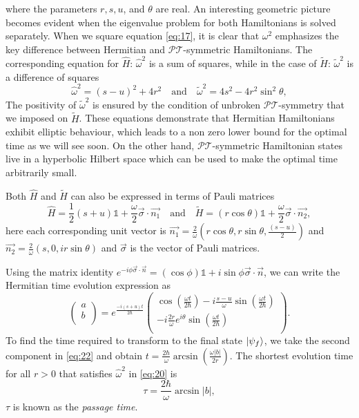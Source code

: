 \documentclass[12pt, a4paper]{report}
\newcommand\PT{\(\mathcal{PT}\)}
\begin{document}
where the parameters $r, s, u$, and $\theta$ are real.
An interesting geometric picture becomes evident when the eigenvalue problem for both Hamiltonians is solved separately. When we square equation \ref{eq:17}, it is clear that $\omega^2$ emphasizes the key
difference between Hermitian and \PT -symmetric
Hamiltonians\cite{Bender_2007}. The corresponding equation for $\hat{H}$: $\hat{\omega}^2$ is a sum of squares, while in the case of $\tilde{H}$: $\tilde{\omega}^2$ is a difference of squares
\begin{equation}\label{eq:20}
\hat{\omega}^{2} = (s - u)^2 + 4r^2 \quad\mathrm{and}\quad \tilde{\omega}^2 = 4s^2 - 4r^2 \sin^2\theta,
\end{equation}
The positivity of $\tilde{\omega}^2$ is ensured by the condition of unbroken \PT-symmetry\cite{Bender_2007} that we imposed on $\tilde{H}$.
These equations demonstrate that Hermitian Hamiltonians exhibit elliptic behaviour, which leads to a non zero lower bound for the optimal time\cite{Bender_2007} as we will see soon. On the other hand, \PT-symmetric Hamiltonian states live in a hyperbolic Hilbert space which can be used to make the optimal time arbitrarily small.

Both $\hat{H}$ and $\tilde{H}$ can also be expressed in terms of Pauli matrices
\begin{equation}\label{eq:21}
\hat{H} = \frac{1}{2}(s+u)\mathds{1} + \frac{\omega}{2}\vec{\sigma} \cdot\vec{n_1}\quad\mathrm{and}\quad \tilde{H} = (r\cos\theta)\mathds{1} + \frac{\omega}{2}\vec{\sigma} \cdot\vec{n_2},
\end{equation} 
here each corresponding unit vector is $\vec{n_1} = \frac{2}{\omega}(r\cos\theta, r\sin\theta, \frac{(s-u)}{2})$ and $\vec{n_2} = \frac{2}{\omega}(s, 0 , ir\sin\theta)$ and $\vec{\sigma}$ is the vector of Pauli matrices.

Using the matrix identity $e^{-i\phi\vec{\sigma} \cdot\vec{n}} = (\cos\phi)\mathds{1} + i\sin\phi\vec{\sigma} \cdot\vec{n}$, we can write the Hermitian time evolution expression as
\begin{equation}\label{eq:22}
\begin{pmatrix}
a \\
b \\                
\end{pmatrix} = e^{\frac{-i(s+u)t}{2\hbar}}
\begin{pmatrix}
\cos(\frac{\omega t}{2\hbar}) - i \frac{s - u}{\omega} \sin(\frac{\omega t}{2\hbar})\\
- i \frac{2r}{\omega} e^{i \theta} \sin(\frac{\omega t}{2\hbar}) \\
\end{pmatrix}.
\end{equation}
To find the time required to transform to the final state $\ket{\psi_f}$, we take the second component in \ref{eq:22} and obtain $t = \frac{2\hbar}{\omega}\arcsin(\frac{\omega|b|}{2 r})$. The shortest evolution time for all $r>0$ that satisfies $\hat{\omega}^2$ in \ref{eq:20} is
\begin{equation}\label{eq:23}
\tau = \frac{2\hbar}{\omega}\arcsin|b|,
\end{equation}
$\tau$ is known as the \emph{passage time}\cite{passage_t}.
\end{document}
